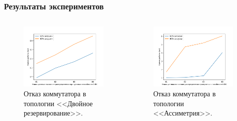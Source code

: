 \documentclass[14pt, handout]{beamer}
\begin{document}
\begin{frame}
\frametitle{Результаты экспериментов}

\begin{minipage}[0.2\textheight]{\textwidth}
	\begin{columns}[T]
		
		\begin{column}{0.5\textwidth}
			\begin{figure}[h!]
				\centering
				\includegraphics[width=1.0\textwidth]{img/double_res_sw.png}
				\caption*{Отказ коммутатора в топологии <<Двойное резервирование>>.}
			\end{figure}
		\end{column}
		\begin{column}{0.5\textwidth}
			\begin{figure}[h!]
				\centering
				\includegraphics[width=1.0\textwidth]{img/5node_res_sw.png}
				\caption*{Отказ коммутатора в топологии <<Ассиметрия>>.}
			\end{figure}
		\end{column}
	\end{columns}
\end{minipage}


\end{frame}
\end{document}
